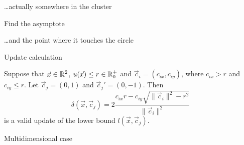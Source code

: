 \documentclass[10pt, compress]{beamer}
\newcommand{\x}{\vec{x}}
\newcommand{\cj}{\vec{c}_j}
\newcommand{\ci}{\vec{c}_i}
\newcommand{\ux}{u(\x)}
\newcommand{\lxcj}{l(\x, \cj)}
\newcommand{\movcj}{\| \cj - \cj' \|}
\newcommand{\deltaxcj}{\delta(\x, \cj)}
\newcommand{\mci}{m(\ci)}
\begin{document}
\begin{frame}{\ldots actually somewhere in the cluster}
  \begin{center}
    
  \end{center}
\end{frame}

\begin{frame}{Find the asymptote}
  \begin{center}
    
  \end{center}
\end{frame}

\begin{frame}{\ldots and the point where it touches the circle}
  \begin{center}
    
  \end{center}
\end{frame}

\begin{frame}{Update calculation}
\vspace{-0.5cm}
\begin{lemma}
Suppose that $\x \in \R^2$, $\ux \leq r \in \Rpz$ and $\ci = (c_{ix}, c_{iy})$,
where $c_{ix} > r$ and $c_{iy} \leq r$. Let $\cj=(0,1)$ and $\cj'=(0,-1)$. Then
\begin{equation*}
    \deltaxcj =
        2\frac{
            c_{ix} r
            -
            c_{iy} \sqrt{\| \ci \|^2 - r^2}
        }{
             \| \ci \|^2
        }
\end{equation*}
is a valid update of the lower bound $\lxcj$.
\end{lemma}
  \begin{center}
    
  \end{center}
\end{frame}

\begin{frame}{Multidimensional case}
  \begin{center}
    
  \end{center}
\end{frame}

\end{document}
